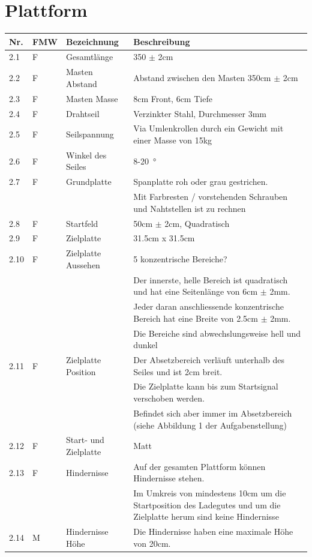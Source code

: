 \documentclass[a4paper]{report}
\begin{document}
\section{Plattform}
\label{app:sec:Plattform}
\begin{tabular}{|p{}|p{}|p{}|p{}|}
	\hline
	\textbf{Nr.} & \textbf{FMW\footnotemark} & \textbf{Bezeichnung} & \textbf{Beschreibung} \\
	\hline
	2.1 & F & Gesamtlänge & 350 $\pm$ 2cm \\
	\hline
	2.2 & F & Masten Abstand & Abstand zwischen den Masten 350cm $\pm$ 2cm \\
	\hline
	2.3 & F & Masten Masse & 8cm Front, 6cm Tiefe \\
	\hline
	2.4 & F & Drahtseil & Verzinkter Stahl, Durchmesser 3mm \\
	\hline
	2.5 & F & Seilspannung & Via Umlenkrollen durch ein Gewicht mit einer Masse von 15kg \\
	\hline
	2.6 & F & Winkel des Seiles & 8-20\SI{}{\degree}\\
	\hline
	2.7 & F & Grundplatte & Spanplatte roh oder grau gestrichen.\\
	& & & Mit Farbresten / vorstehenden Schrauben und Nahtstellen ist zu rechnen \\
	\hline
	2.8 & F & Startfeld & 50cm $\pm$ 2cm, Quadratisch \\
	\hline
	2.9 & F & Zielplatte & 31.5cm x 31.5cm \\
	\hline
	2.10 & F & Zielplatte Aussehen & 5 konzentrische Bereiche?\\
	& & & Der innerste, helle Bereich ist quadratisch und hat eine Seitenlänge von 6cm $\pm$ 2mm. \\
	& & & Jeder daran anschliessende konzentrische Bereich hat eine Breite von 2.5cm $\pm$ 2mm. \\
	& & & Die Bereiche sind abwechslungsweise hell und dunkel \\
	\hline
	2.11 & F & Zielplatte Position & Der Absetzbereich verläuft unterhalb des Seiles und ist 2cm breit.\\
	& & & Die Zielplatte kann bis zum Startsignal verschoben werden.\\
	& & & Befindet sich aber immer im Absetzbereich (siehe Abbildung 1 der Aufgabenstellung) \\
	\hline
	2.12 & F & Start- und Zielplatte & Matt \\
	\hline
	2.13 & F & Hindernisse & Auf der gesamten Plattform können Hindernisse stehen.\\
	& & & Im Umkreis von mindestens 10cm um die Startposition des Ladegutes und um die Zielplatte herum sind keine Hindernisse \\
	\hline
	2.14 & M & Hindernisse Höhe & Die Hindernisse haben eine maximale Höhe von 20cm. \\
	\hline
\end{tabular}
\end{document}
